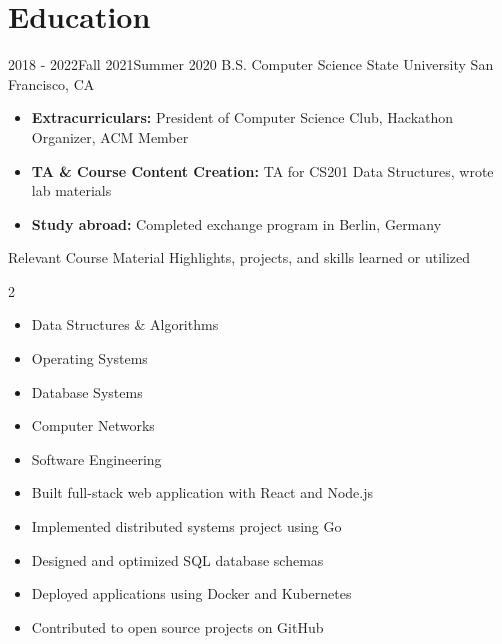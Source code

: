 \documentclass[12pt,letter,sans]{moderncv/moderncv}
\begin{document}
\maketitle

\vspace*{-14mm}


\section{Education}

\cventry
  {2018 - 2022\break\break Fall 2021\break Summer 2020}
  {B.S. Computer Science}
  {State University}
  {San Francisco, CA}{}{%
    \begin{itemize}
	\item \textbf{Extracurriculars:} President of Computer Science Club, Hackathon Organizer, ACM Member
	\item \textbf{TA \& Course Content Creation:} TA for CS201 Data Structures, wrote lab materials
      \item \textbf{Study abroad:} Completed exchange program in Berlin, Germany
    \end{itemize}
  }

\cventry
  {}
  {Relevant Course Material}
  {}
  {Highlights, projects, and skills learned or utilized}{}{%
  \begin{multicols}{2}
    \begin{itemize}
      \item Data Structures \& Algorithms
      \item Operating Systems
      \item Database Systems
      \item Computer Networks
      \item Software Engineering
    \end{itemize}
    \columnbreak
    \begin{itemize}
      \item[] Built full-stack web application with React and Node.js
      \item[] Implemented distributed systems project using Go
      \item[] Designed and optimized SQL database schemas
      \item[] Deployed applications using Docker and Kubernetes
      \item[] Contributed to open source projects on GitHub
    \end{itemize}
  \end{multicols}
}
\end{document}
